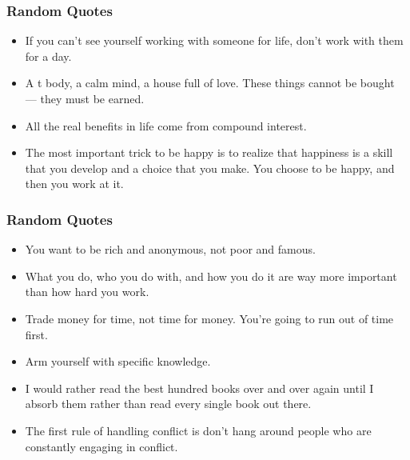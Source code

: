 \begin{frame}[fragile]\frametitle{ Random Quotes}

\begin{itemize}
\item If you can’t see yourself working with someone for life, don’t work
with them for a day.

\item A  t body, a calm mind, a house full of love. These things cannot be
bought — they must be earned.

\item All the real benefits in life come from compound interest.

\item The most important trick to be happy is to realize that happiness is a
skill that you develop and a choice that you make. You choose to be
happy, and then you work at it.

\end{itemize}

\end{frame}


\begin{frame}[fragile]\frametitle{ Random Quotes}

\begin{itemize}
\item You want to be rich and anonymous, not poor and famous.
\item What you do, who you do with, and how you do it are way more
important than how hard you work.
\item Trade money for time, not time for money. You’re going to run out of
time first.
\item Arm yourself with specific knowledge.

\item I would rather read the best hundred books over and over again until I
absorb them rather than read every single book out there.

\item The  first rule of handling conflict is don’t hang around people who are
constantly engaging in conflict.
\end{itemize}

\end{frame}

